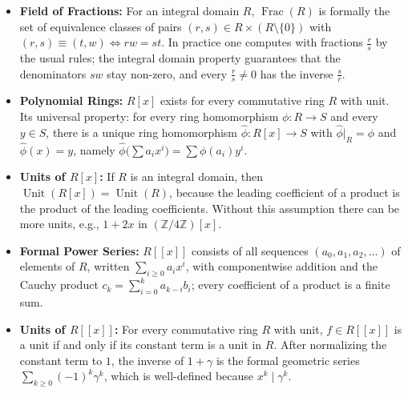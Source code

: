 \begin{overview}
\begin{itemize}
    \item \textbf{Field of Fractions:} For an integral domain $R$, $\operatorname{Frac}(R)$ is formally the set of equivalence classes of pairs $(r, s) \in R \times (R \setminus \{0\})$ with $(r, s) \equiv (t, w) \iff rw = st$. In practice one computes with fractions $\frac{r}{s}$ by the usual rules; the integral domain property guarantees that the denominators $sw$ stay non-zero, and every $\frac{r}{s} \neq 0$ has the inverse $\frac{s}{r}$.
    \item \textbf{Polynomial Rings:} $R[x]$ exists for every commutative ring $R$ with unit. Its universal property: for every ring homomorphism $\phi \colon R \to S$ and every $y \in S$, there is a unique ring homomorphism $\hat{\phi} \colon R[x] \to S$ with $\hat{\phi}|_R = \phi$ and $\hat{\phi}(x) = y$, namely $\hat{\phi}\bigl(\sum a_i x^i\bigr) = \sum \phi(a_i) y^i$.
    \item \textbf{Units of $R[x]$:} If $R$ is an integral domain, then $\operatorname{Unit}(R[x]) = \operatorname{Unit}(R)$, because the leading coefficient of a product is the product of the leading coefficients. Without this assumption there can be more units, e.g., $1 + 2x$ in $(\mathbb{Z}/4\mathbb{Z})[x]$.
    \item \textbf{Formal Power Series:} $R[[x]]$ consists of all sequences $(a_0, a_1, a_2, \dots)$ of elements of $R$, written $\sum_{i \ge 0} a_i x^i$, with componentwise addition and the Cauchy product $c_k = \sum_{i=0}^k a_{k-i} b_i$; every coefficient of a product is a finite sum.
    \item \textbf{Units of $R[[x]]$:} For every commutative ring $R$ with unit, $f \in R[[x]]$ is a unit if and only if its constant term is a unit in $R$. After normalizing the constant term to $1$, the inverse of $1 + \gamma$ is the formal geometric series $\sum_{k \ge 0} (-1)^k \gamma^k$, which is well-defined because $x^k \mid \gamma^k$.
\end{itemize}
\end{overview}
